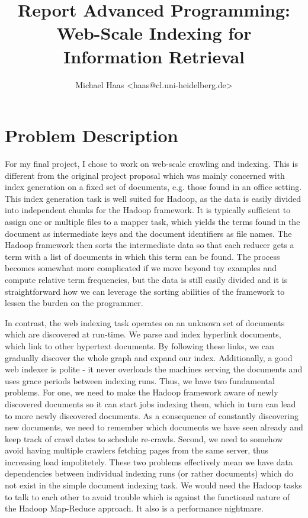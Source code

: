 \documentclass[12pt,a4paper]{report}
\author{Michael Haas <haas@cl.uni-heidelberg.de>}
\title{Report Advanced Programming: Web-Scale Indexing for Information Retrieval}
\begin{document}
\maketitle
\section{Problem Description}
\label{ProblemDescription} 
For my final project, I chose to work on web-scale crawling and indexing. This is different from the original
project proposal which was mainly concerned with index generation on a fixed set of documents, e.g. those
found in an office setting. This index generation task is well suited for Hadoop, as the data is easily divided
into independent chunks for the Hadoop framework. It is typically sufficient to assign one or multiple files
to a mapper task, which yields the terms found in the document as intermediate keys and the document identifiers
as file names. The Hadoop framework then sorts the intermediate data so that each reducer gets a term with a list
of documents in which this term can be found. The process becomes somewhat more complicated if we move beyond toy examples
and compute relative term frequencies, but the data is still easily divided and it is straightforward how we can leverage
the sorting abilities of the framework to lessen the burden on the programmer.

In contrast, the web indexing task operates on an unknown set of documents which are discovered at run-time.
We parse and index hyperlink documents, which link to other hypertext documents. By following these links, we can
gradually discover the whole graph and expand our index. Additionally, a good web indexer is polite - it never overloads
the machines serving the documents and uses grace periods between indexing runs. Thus, we have two fundamental problems.
For one, we need to make the Hadoop framework aware of newly discovered documents so it can start jobs indexing them, which
in turn can lead to more newly discovered documents. As a consequence of constantly discovering new documents,
we need to remember which documents we have seen already and keep track of crawl dates to schedule re-crawls.
Second, we need to somehow avoid having multiple crawlers fetching
pages from the same server, thus increasing load impolitetely. These two problems effectively mean
we have data dependencies between
individual indexing runs (or rather documents) which do not exist in the simple document indexing task. We would need the Hadoop
tasks to talk to each other to avoid trouble which is against the functional nature of the Hadoop Map-Reduce approach. It
also is a performance nightmare.
\end{document}
